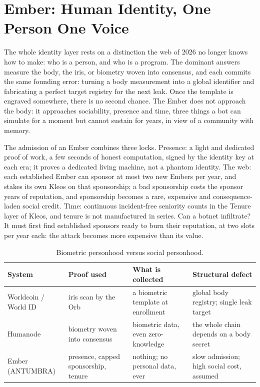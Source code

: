 
\section{Ember: Human Identity, One Person One Voice}\label{sec:ember}

The whole identity layer rests on a distinction the web of 2026 no longer
knows how to make: who is a person, and who is a program. The dominant
answers measure the body, the iris, or biometry woven into consensus, and
each commits the same founding error: turning a body measurement into a
global identifier and fabricating a perfect target registry for the next
leak. Once the template is engraved somewhere, there is no second chance.
The Ember does not approach the body: it approaches sociability, presence
and time, three things a bot can simulate for a moment but cannot sustain
for years, in view of a community with memory.

The admission of an Ember combines three locks. Presence: a light and
dedicated proof of work, a few seconds of honest computation, signed by
the identity key at each era; it proves a dedicated living machine, not a
phantom identity. The web: each established Ember can sponsor at most two
new Embers per year, and stakes its own Kleos on that sponsorship; a bad
sponsorship costs the sponsor years of reputation, and sponsorship becomes
a rare, expensive and consequence-laden social credit. Time: continuous
incident-free seniority counts in the Tenure layer of Kleos, and tenure
is not manufactured in series. Can a botnet infiltrate? It must first
find established sponsors ready to burn their reputation, at two slots
per year each: the attack becomes more expensive than its value.

\begin{table}[htbp]
\centering
\small
\caption{Biometric personhood versus social personhood.}
\label{tab:personhood}
\begin{tabularx}{\textwidth}{@{}L{3.2cm}YYY@{}}
\toprule
System & Proof used & What is collected & Structural defect \\
\midrule
Worldcoin / World ID & iris scan by the Orb & a biometric template at enrollment & global body registry; single leak target \\
Humanode & biometry woven into consensus & biometric data, even zero-knowledge & the whole chain depends on a body secret \\
Ember (ANTUMBRA) & presence, capped sponsorship, tenure & nothing; no personal data, ever & slow admission; high social cost, assumed \\
\bottomrule
\end{tabularx}
\end{table}

